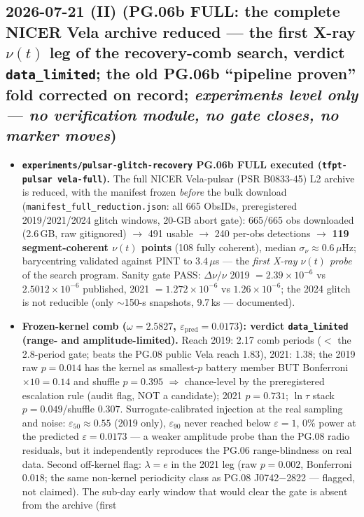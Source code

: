 \documentclass[11pt]{article}
\begin{document}
\subsection*{2026-07-21 (II) (PG.06b FULL: the complete NICER Vela archive reduced --- the first X-ray $\nu(t)$ leg of the recovery-comb search, verdict \texttt{data\_limited}; the old PG.06b ``pipeline proven'' fold corrected on record; \emph{experiments level only --- no verification module, no gate closes, no marker moves})}
\begin{itemize}[leftmargin=1.5em]
\item \textbf{\texttt{experiments/pulsar-glitch-recovery} PG.06b FULL executed (\texttt{tfpt-pulsar vela-full}).}
The full NICER Vela-pulsar (PSR B0833-45) L2 archive is reduced, with the manifest frozen \emph{before} the
bulk download (\texttt{manifest\_full\_reduction.json}: all 665 ObsIDs, preregistered 2019/2021/2024 glitch
windows, 20-GB abort gate): 665/665 obs downloaded (2.6\,GB, raw gitignored) $\to$ 491 usable $\to$ 240
per-obs detections $\to$ \textbf{119 segment-coherent $\nu(t)$ points} (108 fully coherent), median
$\sigma_\nu\approx0.6\,\mu$Hz; barycentring validated against PINT to $3.4\,\mu$s --- the \emph{first
X-ray $\nu(t)$ probe} of the search program. Sanity gate PASS: $\Delta\nu/\nu$ 2019 $=2.39\times10^{-6}$
vs $2.5012\times10^{-6}$ published, 2021 $=1.272\times10^{-6}$ vs $1.26\times10^{-6}$; the 2024 glitch is
not reducible (only $\sim$150-s snapshots, 9.7\,ks --- documented).
\item \textbf{Frozen-kernel comb ($\omega=2.5827$, $\varepsilon_{\mathrm{pred}}=0.0173$): verdict
\texttt{data\_limited} (range- and amplitude-limited).} Reach 2019: 2.17 comb periods ($<$ the 2.8-period
gate; beats the PG.08 public Vela reach 1.83), 2021: 1.38; the 2019 raw $p=0.014$ has the kernel as
smallest-$p$ battery member BUT Bonferroni $\times10=0.14$ and shuffle $p=0.395$ $\Rightarrow$ chance-level
by the preregistered escalation rule (audit flag, NOT a candidate); 2021 $p=0.731$; $\ln\tau$ stack
$p=0.049$/shuffle $0.307$. Surrogate-calibrated injection at the real sampling and noise:
$\varepsilon_{50}\approx0.55$ (2019 only), $\varepsilon_{90}$ never reached below $\varepsilon=1$, 0\% power
at the predicted $\varepsilon=0.0173$ --- a weaker amplitude probe than the PG.08 radio residuals, but it
independently reproduces the PG.06 range-blindness on real data. Second off-kernel flag: $\lambda=e$ in the
2021 leg (raw $p=0.002$, Bonferroni $0.018$; the same non-kernel periodicity class as PG.08 J0742$-$2822 ---
flagged, not claimed). The sub-day early window that would clear the gate is absent from the archive (first

\end{itemize}
\end{document}
